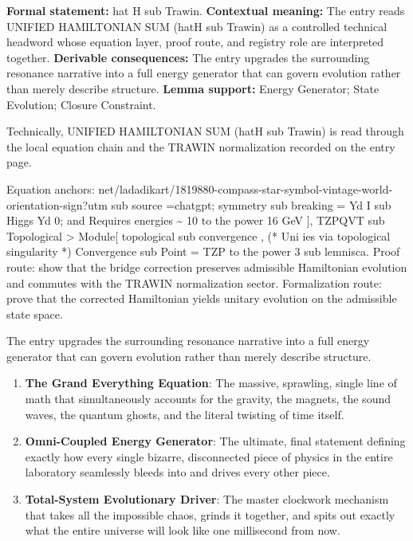 \begingroup\footnotesize\setlength{\emergencystretch}{3em}\sloppy
\textbf{Formal statement:} hat H sub Trawin. \textbf{Contextual meaning:} The entry reads UNIFIED HAMILTONIAN SUM (hatH sub Trawin) as a controlled technical headword whose equation layer, proof route, and registry role are interpreted together. \textbf{Derivable consequences:} The entry upgrades the surrounding resonance narrative into a full energy generator that can govern evolution rather than merely describe structure. \textbf{Lemma support:} Energy Generator; State Evolution; Closure Constraint.\par
\endgroup

Technically, UNIFIED HAMILTONIAN SUM (hatH sub Trawin) is read through the local equation chain and the TRAWIN normalization recorded on the entry page.

Equation anchors: net/ladadikart/1819880-compass-star-symbol-vintage-world-orientation-sign?utm sub source =chatgpt; symmetry sub breaking =  Yd   I   sub Higgs Yd      0; and Requires energies \textasciitilde{} 10 to the power 16 GeV ], TZPQVT sub Topological  > Module[ topological sub convergence , (* Uni ies via topological singularity *) Convergence sub Point = TZP         to the power 3 sub lemnisca. Proof route: show that the bridge correction preserves admissible Hamiltonian evolution and commutes with the TRAWIN normalization sector. Formalization route: prove that the corrected Hamiltonian yields unitary evolution on the admissible state space.

The entry upgrades the surrounding resonance narrative into a full energy generator that can govern evolution rather than merely describe structure.
\endgroup

\begin{enumerate}[leftmargin=1.6em,itemsep=6pt,topsep=4pt]
\item \textbf{The Grand Everything Equation}: The massive, sprawling, single line of math that simultaneously accounts for the gravity, the magnets, the sound waves, the quantum ghosts, and the literal twisting of time itself.
\item \textbf{Omni-Coupled Energy Generator}: The ultimate, final statement defining exactly how every single bizarre, disconnected piece of physics in the entire laboratory seamlessly bleeds into and drives every other piece.
\item \textbf{Total-System Evolutionary Driver}: The master clockwork mechanism that takes all the impossible chaos, grinds it together, and spits out exactly what the entire universe will look like one millisecond from now.
\end{enumerate}

